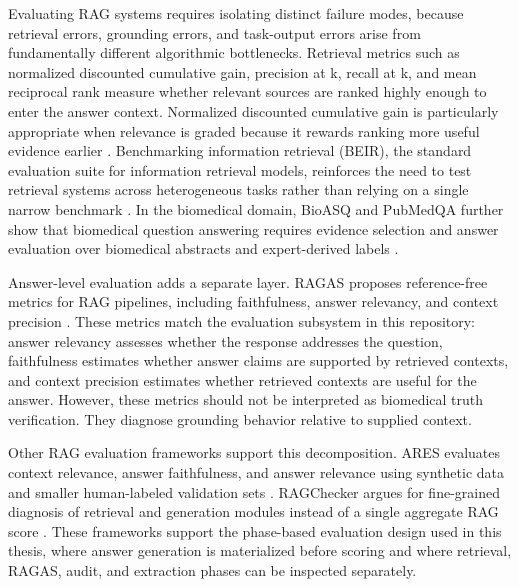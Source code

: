 Evaluating RAG systems requires isolating distinct failure modes, because retrieval errors, grounding errors, and task-output errors arise from fundamentally different algorithmic bottlenecks. Retrieval metrics such as normalized discounted cumulative gain, precision at k, recall at k, and mean reciprocal rank measure whether relevant sources are ranked highly enough to enter the answer context. Normalized discounted cumulative gain is particularly appropriate when relevance is graded because it rewards ranking more useful evidence earlier \cite{jarvelin2002ndcg}. Benchmarking information retrieval (BEIR), the standard evaluation suite for information retrieval models, reinforces the need to test retrieval systems across heterogeneous tasks rather than relying on a single narrow benchmark \cite{thakur2021beir}. In the biomedical domain, BioASQ and PubMedQA further show that biomedical question answering requires evidence selection and answer evaluation over biomedical abstracts and expert-derived labels \cite{tsatsaronis2015bioasq,jin2019pubmedqa}.

Answer-level evaluation adds a separate layer. RAGAS proposes reference-free metrics for RAG pipelines, including faithfulness, answer relevancy, and context precision \cite{es2024ragas}. These metrics match the evaluation subsystem in this repository: answer relevancy assesses whether the response addresses the question, faithfulness estimates whether answer claims are supported by retrieved contexts, and context precision estimates whether retrieved contexts are useful for the answer. However, these metrics should not be interpreted as biomedical truth verification. They diagnose grounding behavior relative to supplied context.

Other RAG evaluation frameworks support this decomposition. ARES evaluates context relevance, answer faithfulness, and answer relevance using synthetic data and smaller human-labeled validation sets \cite{saadfalcon2024ares}. RAGChecker argues for fine-grained diagnosis of retrieval and generation modules instead of a single aggregate RAG score \cite{ru2024ragchecker}. These frameworks support the phase-based evaluation design used in this thesis, where answer generation is materialized before scoring and where retrieval, RAGAS, audit, and extraction phases can be inspected separately.

